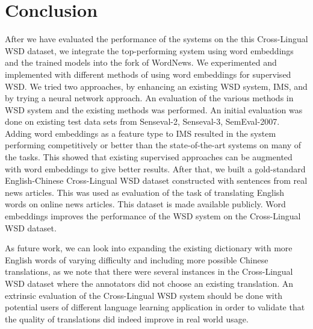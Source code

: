 \section{Conclusion}
\label{section:conclusion}

After we have evaluated the performance of the systems on the this Cross-Lingual WSD dataset, we integrate the top-performing system using word embeddings and the trained models into the fork of WordNews. We experimented and implemented with different methods of using word embeddings for supervised WSD. We tried two approaches, by enhancing an existing WSD system, IMS, and by trying a neural network approach. An evaluation of the various methods in WSD system and the existing methods was performed. An initial evaluation was done on existing test data sets from Senseval-2, Senseval-3, SemEval-2007. Adding word embeddings as a feature type to IMS resulted in the system performing competitively or better than the state-of-the-art systems on many of the tasks. This showed that existing supervised approaches can be augmented with word embeddings to give better results. After that, we built a gold-standard English-Chinese Cross-Lingual WSD dataset constructed with sentences from real news articles. This was used as evaluation of the task of translating English words on online news articles. This dataset is made available publicly. Word embeddings improves the performance of the WSD system on the Cross-Lingual WSD dataset. 

As future work, we can look into expanding the existing dictionary with more English words of varying difficulty and including more possible Chinese translations, as we note that there were several instances in the Cross-Lingual WSD dataset where the annotators did not choose an existing translation. An extrinsic evaluation of the Cross-Lingual WSD system should be done with potential users of different language learning application in order to validate that the quality of translations did indeed improve in real world usage. 
